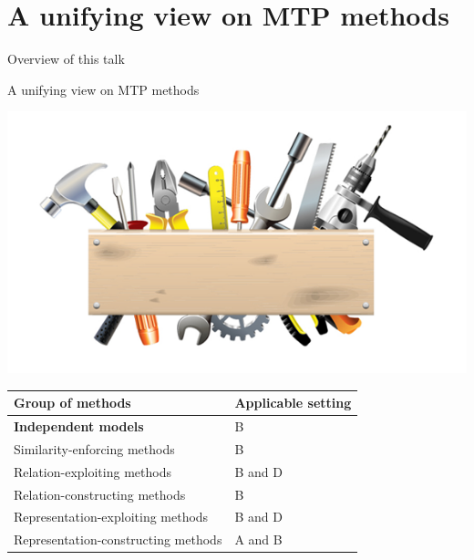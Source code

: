 \documentclass[]{beamer}
\renewcommand{\alert}[1]{\textbf{\color{putblue} #1}}
\begin{document}
\section{A unifying view on MTP methods}


\begin{frame}{Overview of this talk}

\tableofcontents

\end{frame}

\begin{frame}{A unifying view on MTP methods}

\begin{center}
\includegraphics[scale=0.3]{pics/tools}

\begin{tabular}{ll}
\hline
Group of methods & Applicable setting \\
\hline
\hline
\alert{Independent models} & B \\
Similarity-enforcing methods & B   \\ 
Relation-exploiting methods & B and D  \\
Relation-constructing methods & B \\
Representation-exploiting methods & B and D \\
Representation-constructing methods & A and B \\
\hline  
\end{tabular}
\end{center}
\end{frame}

\end{document}
